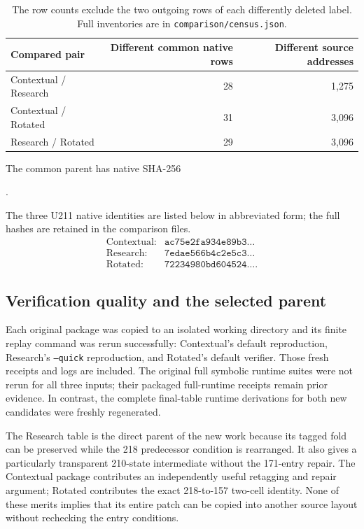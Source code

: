 \begin{table}[ht]
\centering\small
\begin{tabular}{lrr}
\toprule
Compared pair & Different common native rows & Different source addresses\\
\midrule
Contextual / Research & 28 & 1,275\\
Contextual / Rotated & 31 & 3,096\\
Research / Rotated & 29 & 3,096\\
\bottomrule
\end{tabular}
\caption{The row counts exclude the two outgoing rows of each differently
deleted label. Full inventories are in \texttt{comparison/census.json}.}
\end{table}

The common parent has native SHA-256
\begin{center}\small
{}.
\end{center}
The three U211 native identities are listed below in abbreviated form;
the full hashes are retained in the comparison files.
\[
 \begin{array}{ll}
 \text{Contextual:}&\texttt{ac75e2fa934e89b3\ldots}\\
 \text{Research:}&\texttt{7edae566b4c2e5c3\ldots}\\
 \text{Rotated:}&\texttt{72234980bd604524\ldots}.
 \end{array}
\]

\subsection{Verification quality and the selected parent}
Each original package was copied to an isolated working directory and its
finite replay command was rerun successfully: Contextual's default reproduction,
Research's \texttt{--quick} reproduction, and Rotated's default verifier.
Those fresh receipts and logs are included. The original full symbolic runtime
suites were not rerun for all three inputs; their packaged full-runtime
receipts remain prior evidence. In contrast, the complete final-table runtime
derivations for both new candidates were freshly regenerated.

The Research table is the direct parent of the new work because its tagged
fold can be preserved while the 218 predecessor condition is rearranged.
It also gives a particularly transparent 210-state intermediate without the
171-entry repair. The Contextual package contributes an independently useful
retagging and repair argument; Rotated contributes the exact 218-to-157
two-cell identity. None of these merits implies that its entire patch can be
copied into another source layout without rechecking the entry conditions.

